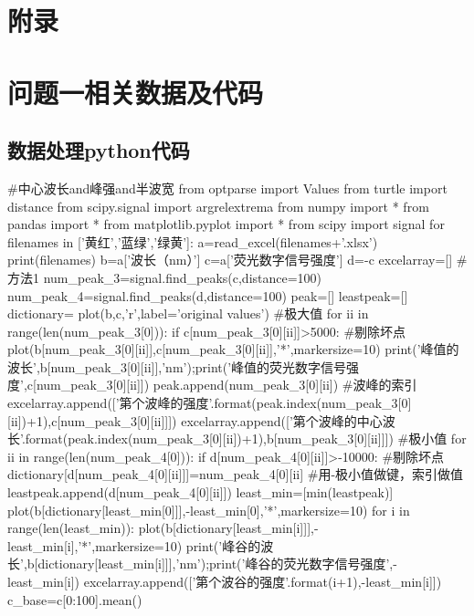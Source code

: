 \documentclass{article}
\numberwithin{equation}{subsection}
\begin{document}
\newpage

{\centering\section*{附录}}
\appendix


\section{问题一相关数据及代码}
\subsection{数据处理python代码}
\begin{python}
    #中心波长and峰强and半波宽
from optparse import Values
from turtle import distance
from scipy.signal import argrelextrema
from numpy import *
from pandas import *
from matplotlib.pyplot import *
from scipy import signal
for filenames in ['黄红','蓝绿','绿黄']:
    a=read_excel(filenames+'.xlsx')
    print(filenames)
    b=a['波长（nm）']
    c=a['荧光数字信号强度']
    d=-c
    excelarray=[]
    #方法1
    num_peak_3=signal.find_peaks(c,distance=100)
    num_peak_4=signal.find_peaks(d,distance=100)
    peak=[]
    leastpeak=[]
    dictionary={}
    plot(b,c,'r',label='original values')
    #极大值
    for ii in range(len(num_peak_3[0])):
        if c[num_peak_3[0][ii]]>5000:          #剔除坏点
            plot(b[num_peak_3[0][ii]],c[num_peak_3[0][ii]],'*',markersize=10) 
            print('峰值的波长',b[num_peak_3[0][ii]],'nm');print('峰值的荧光数字信号强度',c[num_peak_3[0][ii]])
            peak.append(num_peak_3[0][ii])          #波峰的索引
            excelarray.append(['第{}个波峰的强度'.format(peak.index(num_peak_3[0][ii])+1),c[num_peak_3[0][ii]]])
            excelarray.append(['第{}个波峰的中心波长'.format(peak.index(num_peak_3[0][ii])+1),b[num_peak_3[0][ii]]])
    #极小值
    for ii in range(len(num_peak_4[0])):
        if d[num_peak_4[0][ii]]>-10000:          #剔除坏点
            dictionary[d[num_peak_4[0][ii]]]=num_peak_4[0][ii]          #用-极小值做键，索引做值
            leastpeak.append(d[num_peak_4[0][ii]])
    least_min=[min(leastpeak)]
    plot(b[dictionary[least_min[0]]],-least_min[0],'*',markersize=10) 
    for i in range(len(least_min)):
        plot(b[dictionary[least_min[i]]],-least_min[i],'*',markersize=10) 
        print('峰谷的波长',b[dictionary[least_min[i]]],'nm');print('峰谷的荧光数字信号强度',-least_min[i])
        excelarray.append(['第{}个波谷的强度'.format(i+1),-least_min[i]])
    c_base=c[0:100].mean()


\end{python}
\end{document}
